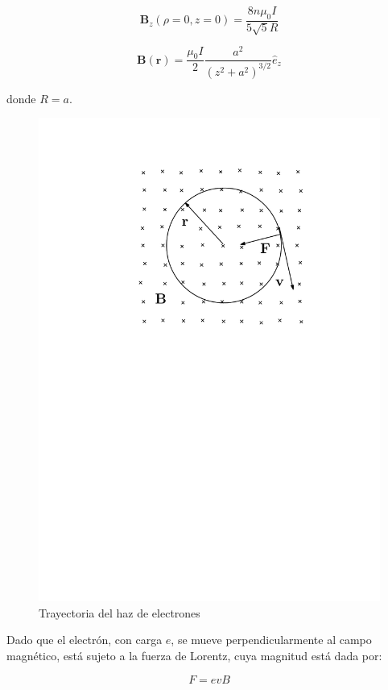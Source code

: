 \begin{equation}
  \mathbf{B}_{z}(\rho=0, z=0) = \frac{8 n \mu_{0} I}{5 \sqrt{5} R}
  \label{eq:Campo_magnetico_enHaz}
\end{equation}

\begin{equation}
  \mathbf{B}(\mathbf{r}) = \frac{\mu_{0}I}{2} \frac{a^{2}}{(z^{2}+a^{2})^{3/2}} \hat{e}_{z}
\end{equation}

donde \( R = a \).

\begin{figure}[htbp!]
  \centering
  \includegraphics[width=0.8\linewidth]{./images/electron-path.pdf}
  \caption{Trayectoria del haz de electrones}
  \label{fig:haz_elelctrones}
\end{figure}

Dado que el electrón, con carga \( e \), se mueve perpendicularmente al campo
magnético, está sujeto a la fuerza de Lorentz, cuya magnitud está dada por:

\begin{equation}
  F = e v B
  \label{eq:FuerzaLorentz}
\end{equation}

